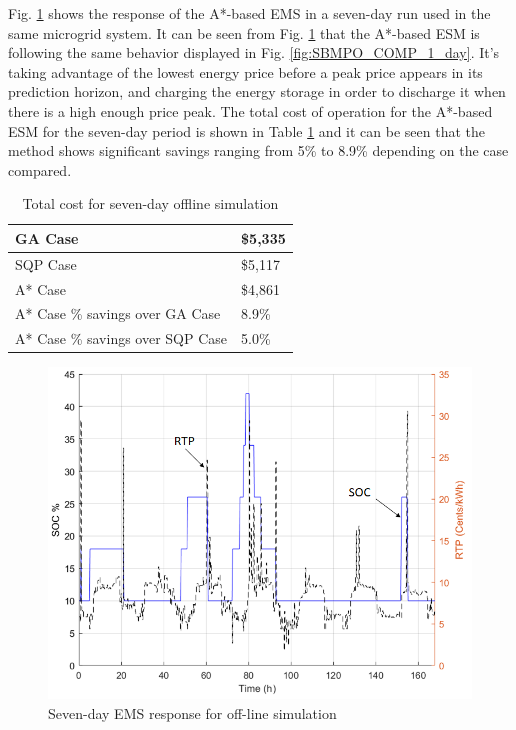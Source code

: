 Fig. \ref{fig:SBMPO_COMP_10_12} shows the response of the A*-based EMS in a seven-day run used in the same microgrid system.  It can be seen from Fig. \ref{fig:SBMPO_COMP_10_12} that the A*-based ESM is following the same behavior displayed in Fig. \ref{fig:SBMPO_COMP_1_day}. It's taking advantage of the lowest energy price before a peak price appears in its prediction horizon, and charging the energy storage in order to discharge it when there is a high enough price peak. The total cost of operation for the A*-based ESM for the seven-day period is shown in Table \ref{tab:Cost1} and it can be seen that the method shows significant savings ranging from 5\% to 8.9\% depending on the case compared.

\begin{table}[htb]
\caption{Total cost for seven-day offline simulation}
\centering
\label{tab:Cost1}
\begin{tabular}{|l|l|}
\hline
GA Case & \$5,335 \\ \hline
SQP Case & \$5,117 \\ \hline
A* Case & \$4,861 \\ \hline
A* Case \% savings over GA Case & 8.9\% \\ \hline
A* Case \% savings over SQP Case & 5.0\% \\ \hline
\end{tabular}
\end{table}

\vspace{-2mm}

\begin{figure}[!ht]
    \centering
    \includegraphics[width = \linewidth]{figs/SBMPO_COMP_10_12.png}
    \caption{Seven-day EMS response for off-line simulation}
    \label{fig:SBMPO_COMP_10_12}
    \vspace{-5mm}
\end{figure}

